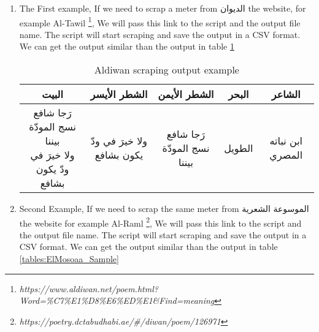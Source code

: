 \begin{enumerate}
\item The First example, If we need to scrap a meter from \textarabic{الديوان} the website, for example Al-Tawil \footnote{ \textit{https://www.aldiwan.net/poem.html?Word=\%C7\%E1\%D8\%E6\%ED\%E1\&Find=meaning}}, We will pass this link to the script and the output file name. The script will start scraping and save the output in a CSV format. We can get the output similar than the output in table \ref{tables:Aldiwan_Sample}


\begin{table}[H]
	\centering
	\begin{tabular}{c c c c c}
		\toprule
          \textbf{\small{\textarabic{البيت}}} & \small{\textbf{\textarabic{الشطر الأيسر}}} & \small{\textbf{\textarabic{الشطر الأيمن}}} &
\small{\textbf{\textarabic{البحر}}} & \small{\textbf{\textarabic{الشاعر}}} \\
          \midrule
\makecell{\textarabic{رَجا شافع نسج المودّة بيننا}\\ \textarabic{ولا خيرَ في ودّ يكون بشافع}} &
\textarabic{ولا خيرَ في ودّ يكون بشافع} &                                                       \textarabic{رَجا شافع نسج المودّة بيننا} &                                                       \textarabic{الطويل}&
\textarabic{ابن نباته المصري}\\
          
		\bottomrule
	\end{tabular}
	\caption{Aldiwan scraping output example }\label{tables:Aldiwan_Sample}
\end{table}

\item Second Example, If we need to scrap the same meter from \textarabic{الموسوعة الشعرية} the website for example Al-Raml \footnote{ \textit{https://poetry.dctabudhabi.ae/\#/diwan/poem/126971}}, We will pass this link to the script and the output file name. The script will start scraping and save the output in a CSV format. We can get the output similar than the output in table \ref{tables:ElMosoaa_Sample}



\end{enumerate}
